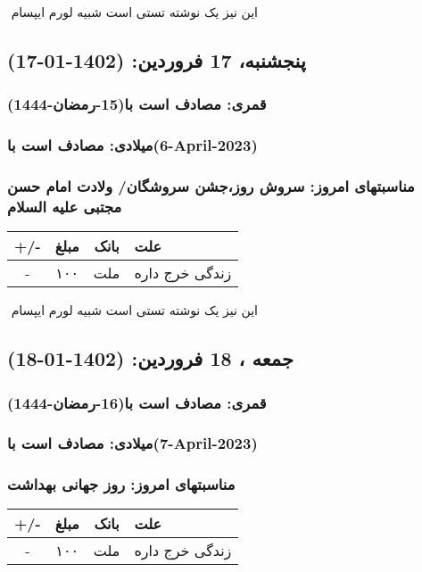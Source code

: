 \documentclass{article}
\newcommand{\rnote}[1]{\marginpar{\textcolor{color}{\StrSubstitute{\##1}{ }{\_}}}}
\newcommand{\myRow}[4]{
    #1 & #2 & #3 & #4 \\ \hline
}
\begin{document}
‌
\rnote{تست}
این نیز یک نوشته تستی است شبیه لورم ایپسام




\newpage
{}
\textcolor{color}{
\section{ پنجشنبه، 17 فروردین: (1402-01-17) }
\subsubsection*{قمری: مصادف است با(15-رمضان-1444)} 
\subsubsection*{میلادی: مصادف است با(6-April-2023)}
\subsubsection*{مناسبتهای امروز: سروش روز،جشن سروشگان/ ولادت امام حسن مجتبی علیه السلام}
}


\begin{tabular}{ | c | c | c | p{5cm} |}
    \hline
    \myRow{ +/- }{مبلغ}{بانک}{علت}
    \myRow{-}{۱۰۰}{ملت}{زندگی خرج داره}
\end{tabular}
\newline
\newline

‌
\rnote{تست}
این نیز یک نوشته تستی است شبیه لورم ایپسام




\newpage
{}
\textcolor{color}{
\section{ جمعه ، 18 فروردین: (1402-01-18) }
\subsubsection*{قمری: مصادف است با(16-رمضان-1444)} 
\subsubsection*{میلادی: مصادف است با(7-April-2023)}
\subsubsection*{مناسبتهای امروز: روز جهانی بهداشت}
}


\begin{tabular}{ | c | c | c | p{5cm} |}
    \hline
    \myRow{ +/- }{مبلغ}{بانک}{علت}
    \myRow{-}{۱۰۰}{ملت}{زندگی خرج داره}
\end{tabular}
\newline
\newline
\end{document}
